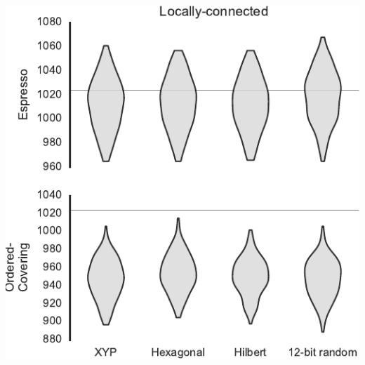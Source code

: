 \documentclass[t]{beamer}
\begin{document}
\begin{frame}[plain]{}
  \includegraphics{keyspaces}
\end{frame}
\end{document}
